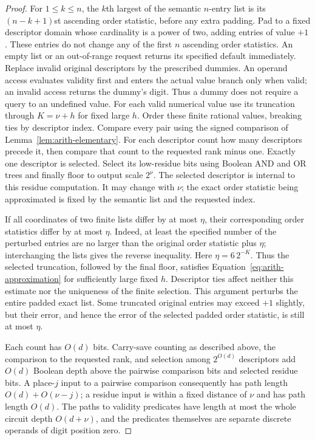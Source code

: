 \begin{proof}
For $1\le k\le n$, the $k$th largest of the semantic $n$-entry list
is its $(n-k+1)$st ascending order statistic, before any extra padding.
Pad to a fixed descriptor domain whose cardinality is a power of
two, adding entries of value $+1$.  These entries do not change
any of the first $n$ ascending order statistics.  An empty list or
an out-of-range request returns its specified default immediately.
Replace invalid original descriptors by the prescribed dummies.
An operand access evaluates validity first and enters the actual
value branch only when valid; an invalid access returns the dummy's
digit.  Thus a dummy does not require a query to an undefined value.
For each valid numerical value use its truncation through
$K=\nu+h$ for fixed large $h$.  Order these finite rational values,
breaking ties by descriptor index.  Compare every pair using the
signed comparison of Lemma~\ref{lem:arith-elementary}.  For each
descriptor count how many descriptors precede it, then compare
that count to the requested rank minus one.  Exactly one
descriptor is selected.  Select its low-residue bits using Boolean
AND and OR trees and finally floor to output scale $2^\nu$.
The selected descriptor is internal to this residue computation.  It
may change with $\nu$; the exact order statistic being approximated is
fixed by the semantic list and the requested index.

If all coordinates of two finite lists differ by at most $\eta$,
their corresponding order statistics differ by at most $\eta$.
Indeed, at least the specified number of the perturbed entries
are no larger than the original order statistic plus $\eta$;
interchanging the lists gives the reverse inequality.  Here
$\eta=6\,2^{-K}$.  Thus the selected truncation, followed by the
final floor, satisfies Equation~\eqref{eq:arith-approximation}
for sufficiently large fixed $h$.  Descriptor ties affect neither
this estimate nor the uniqueness of the finite selection.
This argument perturbs the entire padded exact list.  Some truncated
original entries may exceed $+1$ slightly, but their error, and hence
the error of the selected padded order statistic, is still at most
$\eta$.

Each count has $O(d)$ bits.  Carry-save counting as described
above, the comparison to the requested rank, and selection among
$2^{O(d)}$ descriptors add $O(d)$ Boolean depth above the
pairwise comparison bits and selected residue bits.  A
place-$j$ input to a pairwise comparison consequently has path
length $O(d)+O(\nu-j)$; a residue input is within a fixed distance
of $\nu$ and has path length $O(d)$.  The paths to validity predicates
have length at most the whole circuit depth $O(d+\nu)$, and the
predicates themselves are separate discrete operands of digit position zero.


\end{proof}
